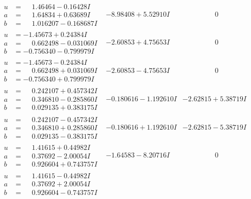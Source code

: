 \documentclass[1p]{elsarticle_modified}
\theoremstyle{definition}
\begin{document}
$$\begin{array}{c|c|c}
\begin{aligned}
u &= \phantom{-}1.46464 - 0.16428 I \\
a &= \phantom{-}1.64834 + 0.63689 I \\
b &= \phantom{-}1.016207 - 0.168687 I\end{aligned}
 & -8.98408 + 5.52910 I & \phantom{-0.000000 } 0 \\ \hline\begin{aligned}
u &= -1.45673 + 0.24384 I \\
a &= \phantom{-}0.662498 - 0.031069 I \\
b &= -0.756340 - 0.799979 I\end{aligned}
 & -2.60853 + 4.75653 I & \phantom{-0.000000 } 0 \\ \hline\begin{aligned}
u &= -1.45673 - 0.24384 I \\
a &= \phantom{-}0.662498 + 0.031069 I \\
b &= -0.756340 + 0.799979 I\end{aligned}
 & -2.60853 - 4.75653 I & \phantom{-0.000000 } 0 \\ \hline\begin{aligned}
u &= \phantom{-}0.242107 + 0.457342 I \\
a &= \phantom{-}0.346810 - 0.285860 I \\
b &= \phantom{-}0.029135 + 0.383175 I\end{aligned}
 & -0.180616 - 1.192610 I & -2.62815 + 5.38719 I \\ \hline\begin{aligned}
u &= \phantom{-}0.242107 - 0.457342 I \\
a &= \phantom{-}0.346810 + 0.285860 I \\
b &= \phantom{-}0.029135 - 0.383175 I\end{aligned}
 & -0.180616 + 1.192610 I & -2.62815 - 5.38719 I \\ \hline\begin{aligned}
u &= \phantom{-}1.41615 + 0.44982 I \\
a &= \phantom{-}0.37692 - 2.00054 I \\
b &= \phantom{-}0.926604 + 0.743757 I\end{aligned}
 & -1.64583 - 8.20716 I & \phantom{-0.000000 } 0 \\ \hline\begin{aligned}
u &= \phantom{-}1.41615 - 0.44982 I \\
a &= \phantom{-}0.37692 + 2.00054 I \\
b &= \phantom{-}0.926604 - 0.743757 I\end{aligned}

\end{array}$$
\end{document}
